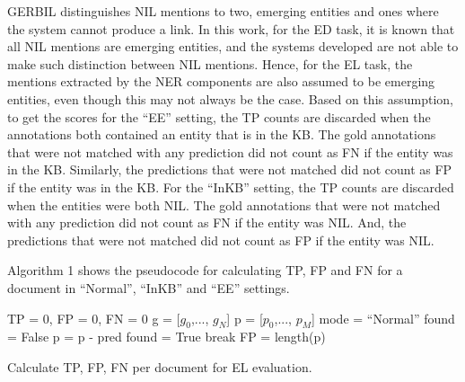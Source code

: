 \documentclass{report}
\theoremstyle{definition}
\theoremstyle{remark}
\begin{document}
GERBIL distinguishes NIL mentions to two, emerging entities and ones where the system cannot produce a link. In this work, for the ED task, it is known that all NIL mentions are emerging entities, and the systems developed are not able to make such distinction between NIL mentions. Hence, for the EL task, the mentions extracted by the NER components are also assumed to be emerging entities, even though this may not always be the case. Based on this assumption, to get the scores for the ``EE'' setting, the TP counts are discarded when the annotations both contained an entity that is in the KB. The gold annotations that were not matched with any prediction did not count as FN if the entity was in the KB. Similarly, the predictions that were not matched did not count as FP if the entity was in the KB. For the ``InKB'' setting, the TP counts are discarded when the entities were both NIL. The gold annotations that were not matched with any prediction did not count as FN if the entity was NIL. And, the predictions that were not matched did not count as FP if the entity was NIL.

Algorithm 1 shows the pseudocode for calculating TP, FP and FN for a document in ``Normal'', ``InKB'' and ``EE'' settings.
\begin{algorithm}
\SetAlgoNoLine
{}
TP = 0, FP = 0, FN = 0\;
g = [$g_0$,..., $g_N$]\;  
p = [$p_0$,..., $p_M$]\;
mode = ``Normal''\;
{   
    found = False \;
    { 
    {
    p = p - pred\;
    found = True\;
    break\;}
    }
    {  
    }
    }
    FP = length(p)\:


\caption{Calculate TP, FP, FN per document for EL evaluation.}
\end{algorithm}

\end{document}
